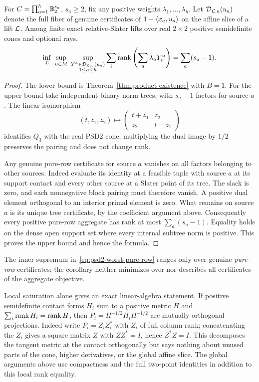 \begin{corollary}
\label{cor:psd2-worst-pure-row}
For $C=\prod_{a=1}^h\mathbb B_2^{s_a}$, $s_a\geq2$, fix any positive weights
$\lambda_1,\ldots,\lambda_h$. Let $\mathcal D_{\mathcal L,a}(u_a)$ denote the full
fiber of genuine certificates of $1-\langle x_a,u_a\rangle$ on the affine slice
of a lift $\mathcal L$. Among finite exact relative-Slater lifts over real
$2\times2$ positive semidefinite cones and optional rays,
\begin{equation}\label{eq:psd2-worst-pure-row}
 \inf_{\mathcal L}\ \sup_{u\in M}\;
 \sup_{\substack{Y^a\in\mathcal D_{\mathcal L,a}(u_a)\\1\leq a\leq h}}
 \sum_i\operatorname{rank}\left(\sum_a\lambda_aY_i^a\right)
 =\sum_a(s_a-1).
\end{equation}
\end{corollary}
\begin{proof}
The lower bound is Theorem~\ref{thm:product-existence} with $B=1$.
For the upper bound take independent binary norm trees, with $s_a-1$
factors for source $a$. The linear isomorphism
\[
 (t,z_1,z_2)\longmapsto
 \begin{pmatrix}t+z_1&z_2\\z_2&t-z_1\end{pmatrix}
\]
identifies $Q_3$ with the real PSD2 cone; multiplying the dual image by
$1/2$ preserves the pairing and does not change rank.

Any genuine pure-row certificate for source $a$ vanishes on all factors
belonging to other sources. Indeed evaluate its identity at a feasible
tuple with source $a$ at its support contact and every other source at
a Slater point of its tree. The slack is zero, and each nonnegative
block pairing must therefore vanish. A positive dual element orthogonal
to an interior primal element is zero. What remains on source $a$ is
its unique tree certificate, by the coefficient argument above.
Consequently every positive pure-row aggregate has rank at most
$\sum_a(s_a-1)$. Equality holds on the dense open support set where
every internal subtree norm is positive. This proves the upper bound
and hence the formula.
\end{proof}

The inner supremum in~\eqref{eq:psd2-worst-pure-row} ranges only over
genuine \emph{pure-row} certificates; the corollary neither minimizes
over nor describes all certificates of the aggregate objective.

Local saturation alone gives an exact linear-algebra statement. If positive semidefinite contact forms $H_i$ sum to a positive
metric $H$ and $\sum_i\operatorname{rank} H_i=\operatorname{rank} H$, then
$P_i=H^{-1/2}H_iH^{-1/2}$ are mutually orthogonal projections. Indeed
write $P_i=Z_iZ_i^*$ with $Z_i$ of full column rank; concatenating the
$Z_i$ gives a square matrix $Z$ with $ZZ^*=I$, hence $Z^*Z=I$.
This decomposes the tangent metric at the contact orthogonally but
says nothing about unused parts of the cone, higher
derivatives, or the global affine slice. The global arguments above use
compactness and the full two-point identities in addition to this local
rank equality.

